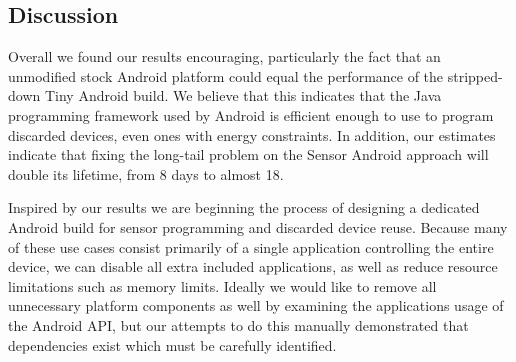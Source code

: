 \subsection{Discussion}

Overall we found our results encouraging, particularly the fact that an
unmodified stock Android platform could equal the performance of the
stripped-down Tiny Android build. We believe that this indicates that the
Java programming framework used by Android is efficient enough to use to
program discarded devices, even ones with energy constraints. In addition,
our estimates indicate that fixing the long-tail problem on the Sensor
Android approach will double its lifetime, from 8 days to almost 18.

Inspired by our results we are beginning the process of designing a dedicated
Android build for sensor programming and discarded device reuse. Because many
of these use cases consist primarily of a single application controlling the
entire device, we can disable all extra included applications, as well as
reduce resource limitations such as memory limits. Ideally we would like to
remove all unnecessary platform components as well by examining the
applications usage of the Android API, but our attempts to do this manually
demonstrated that dependencies exist which must be carefully identified.
